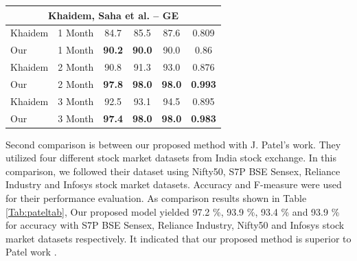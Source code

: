 \documentclass[12pt]{article}
\begin{document}
\begin{table}[H]
{\begin{tabular}{|l|c|c|c|c|c|}
\multicolumn{6}{|c|}{Khaidem, Saha et al. – GE}                                                              \\ \hline
Khaidem                    & 1 Month        & 84.7          & 85.5          & 87.6          & 0.809          \\ \hline
Our                        & 1 Month        & \textbf{90.2} & \textbf{90.0} & 90.0          & 0.86           \\ \hline
Khaidem                    & 2 Month        & 90.8          & 91.3          & 93.0          & 0.876          \\ \hline
Our                        & 2 Month        & \textbf{97.8} & \textbf{98.0} & \textbf{98.0} & \textbf{0.993} \\ \hline
Khaidem                    & 3 Month        & 92.5          & 93.1          & 94.5          & 0.895          \\ \hline
Our                        & 3 Month        & \textbf{97.4} & \textbf{98.0} & \textbf{98.0} & \textbf{0.983} \\  \hline
 \end{tabular}
 }
 \end{table}
  \begin{table}[H]
 \centering
 \caption{Comparison result with Patel.}
 \label{Tab:pateltab}
 \end{table}
Second comparison is between our proposed method with J. Patel's work\cite{patel2015predicting}. They utilized four different stock market datasets from India stock exchange. In this comparison, we followed their dataset using Nifty50, S7P BSE Sensex, Reliance Industry and Infosys stock market datasets. Accuracy and F-measure were used for their performance evaluation. As comparison results shown in Table \ref{Tab:pateltab}, Our proposed model yielded 97.2 \%, 93.9 \%, 93.4 \% and 93.9 \% for accuracy with S7P BSE Sensex, Reliance Industry, Nifty50 and Infosys stock market datasets respectively. It indicated that our proposed method is superior to Patel work \cite{patel2015predicting}.
\end{document}
